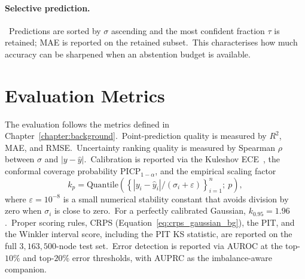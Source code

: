 \paragraph{Selective prediction.}\ Predictions are sorted by $\sigma$ ascending and the most confident fraction $\tau$ is retained; MAE is reported on the retained subset.\ This characterises how much accuracy can be sharpened when an abstention budget is available.

\section{Evaluation Metrics}\label{sec:metrics}

The evaluation follows the metrics defined in Chapter~\ref{chapter:background}.\ Point-prediction quality is measured by $R^2$, MAE, and RMSE.\ Uncertainty ranking quality is measured by Spearman $\rho$ between $\sigma$ and $|y - \hat y|$.\ Calibration is reported via the Kuleshov ECE~\autocite{kuleshov2018accurate}, the conformal coverage probability $\mathrm{PICP}_{1-\alpha}$, and the empirical scaling factor
\begin{equation}\label{eq:kp}
 k_p = \mathrm{Quantile}\!\left(\left\{|y_i - \hat y_i|/(\sigma_i + \varepsilon)\right\}_{i=1}^{n};\ p\right),
\end{equation}
where $\varepsilon = 10^{-8}$ is a small numerical stability constant that avoids division by zero when $\sigma_i$ is close to zero.\ For a perfectly calibrated Gaussian, $k_{0.95} = 1.96$.\ Proper scoring rules, CRPS (Equation~\eqref{eq:crps_gaussian_bg}), the PIT, and the Winkler interval score, including the PIT KS statistic, are reported on the full $3{,}163{,}500$-node test set.\ Error detection is reported via AUROC at the top-$10\%$ and top-$20\%$ error thresholds, with AUPRC as the imbalance-aware companion.
